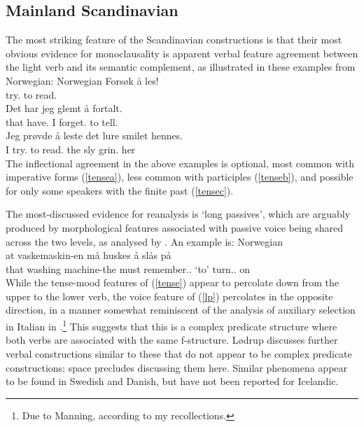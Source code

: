 \documentclass[output=paper,hidelinks]{langscibook}
\begin{document}
\subsection{Mainland Scandinavian}
The most striking feature of the Scandinavian constructions is that their most obvious
evidence for monoclausality is apparent verbal feature agreement between the light
verb and its semantic complement, as illustrated in these examples from Norwegian:
\ea\label{tense} Norwegian \citep[4]{Lodrup2014}
\ea\label{tensea}
\gll Forsøk å les!\\
try.{\IMP} to read.\IMP\\
\ex\label{tenseb}
\gll Det har jeg glemt å fortalt.\\
that have.{\PRS} I forget.{\PTCP} to tell.{\PTCP}\\
\ex\label{tensec}
\gll Jeg prøvde å leste det lure smilet hennes.\\
I try.{\PST} to read.{\PST} the sly grin.{\DEF} her\\
\z\z
The inflectional agreement in the above examples is optional, most common with imperative forms
(\ref{tensea}), less common with participles (\ref{tenseb}), and possible for only some speakers with the finite
past (\ref{tensec}).

The most-discussed evidence for reanalysis is `long passives', which are arguably
produced by morphological features associated with passive voice
being shared across the two levels, as analysed by \citet{Lodrup2014lp}.  An example is:
\ea\label{lp}Norwegian \citep[388]{Lodrup2014lp}\\
\gll at vaskemaskin-en må huskes å slås på\\
that {washing machine}-the must remember.{\INF.\PASS} `to' turn.{\INF.\PASS} on\\
\z
While the tense-mood features of (\ref{tense}) appear to percolate down from the
upper to the lower verb, the voice feature of (\ref{lp}) percolates in the opposite
direction, in a manner somewhat reminiscent
of the analysis of auxiliary selection in Italian in \citet[56--60]{AndrewsManning1999}.\footnote
 {Due to Manning, according to my recollections.} 
This suggests that this is a complex predicate structure where both verbs are
associated with the same f-structure.  L\o drup discusses further verbal constructions
similar to these that do not appear to be complex predicate constructions; space precludes
discussing them here.  Similar phenomena appear to be found in
Swedish and Danish, but have not been reported for Icelandic.
\end{document}
